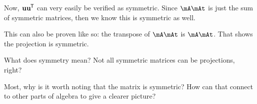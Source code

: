 Now, $\bm{\mathrm{u}}\bm{\mathrm{u}}^{\mkern-1.5mu\mathsf{T}}$ can very easily be verified as symmetric. Since $\mA\mAt$
is just the sum of symmetric matrices, then we know this is symmetric as
well.

This can also be proven like so: the transpose of $\mA\mAt$ is
$\mA\mAt$. That shows the projection is symmetric.

 What
does symmetry mean? Not all symmetric matrices can be projections,
right?

Most, why is it worth noting that the matrix is symmetric? How can
that connect to other parts of algebra to give a clearer picture?
